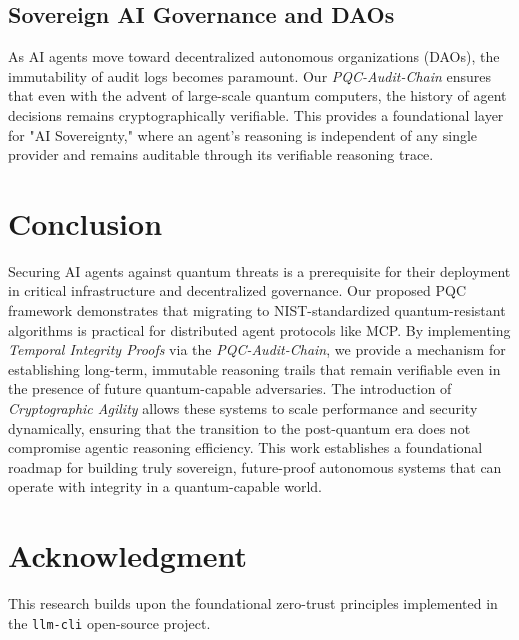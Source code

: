 \documentclass[conference]{IEEEtran}
\begin{document}
\subsection{Sovereign AI Governance and DAOs}
As AI agents move toward decentralized autonomous organizations (DAOs), the immutability of audit logs becomes paramount. Our \textit{PQC-Audit-Chain} ensures that even with the advent of large-scale quantum computers, the history of agent decisions remains cryptographically verifiable. This provides a foundational layer for "AI Sovereignty," where an agent's reasoning is independent of any single provider and remains auditable through its verifiable reasoning trace.

\section{Conclusion}
Securing AI agents against quantum threats is a prerequisite for their deployment in critical infrastructure and decentralized governance. Our proposed PQC framework demonstrates that migrating to NIST-standardized quantum-resistant algorithms is practical for distributed agent protocols like MCP. By implementing \textit{Temporal Integrity Proofs} via the \textit{PQC-Audit-Chain}, we provide a mechanism for establishing long-term, immutable reasoning trails that remain verifiable even in the presence of future quantum-capable adversaries. The introduction of \textit{Cryptographic Agility} allows these systems to scale performance and security dynamically, ensuring that the transition to the post-quantum era does not compromise agentic reasoning efficiency. This work establishes a foundational roadmap for building truly sovereign, future-proof autonomous systems that can operate with integrity in a quantum-capable world.

\section*{Acknowledgment}
This research builds upon the foundational zero-trust principles implemented in the \texttt{llm-cli} open-source project.
\end{document}
